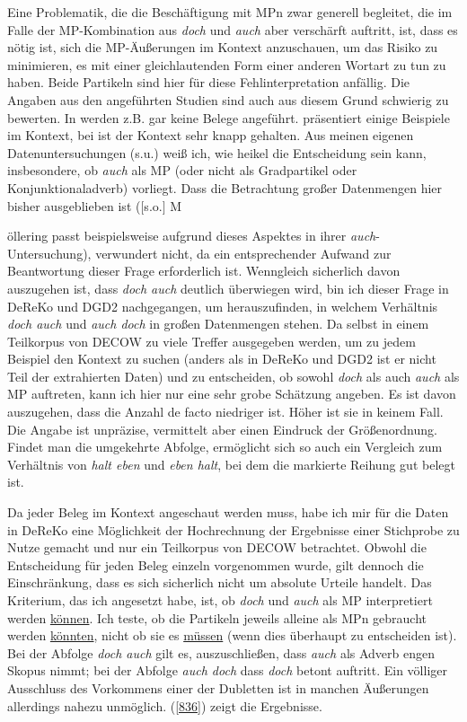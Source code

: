Eine Problematik, die die Beschäftigung mit MPn zwar generell begleitet, die im Falle der MP-Kombination aus \textit{doch} und \textit{auch} aber verschärft auftritt, ist, dass es nötig ist, sich die MP-Äußerungen im Kontext anzuschauen, um das Risiko zu minimieren, es mit einer gleichlautenden Form einer anderen Wortart zu tun zu haben. Beide Partikeln sind hier für diese Fehlinterpretation anfällig. Die Angaben aus den angeführten Studien sind auch aus diesem Grund schwierig zu bewerten. In \citet{Braber2010} werden z.B. gar keine Belege angeführt. \citet{Rudolph1983} präsentiert einige Beispiele im Kontext, bei \citet{Moellering2004} ist der Kontext sehr knapp gehalten. Aus meinen eigenen Datenuntersuchungen (s.u.) weiß ich, wie heikel die Entscheidung sein kann, insbesondere, ob \textit{auch} als MP (oder nicht als Gradpartikel  oder  Konjunktionaladverb) vorliegt. Dass die Betrachtung großer Datenmengen hier bisher ausgeblieben ist ($[$s.o.$]$ M{öllering passt beispielsweise aufgrund dieses Aspektes in ihrer \textit{auch}-Untersuchung), verwundert nicht, da ein entsprechender Aufwand zur Beantwortung dieser Frage erforderlich ist. Wenngleich sicherlich davon auszugehen ist, dass \textit{doch auch} deutlich überwiegen wird, bin ich dieser Frage in DeReKo und DGD2 nachgegangen, um herauszufinden, in welchem Verhältnis \textit{doch auch} und \textit{auch doch} in großen Datenmengen stehen. Da selbst in einem Teilkorpus von DECOW zu viele Treffer ausgegeben werden, um zu jedem Beispiel den Kontext zu suchen (anders als in DeReKo und DGD2 ist er nicht Teil der extrahierten Daten) und zu entscheiden, ob sowohl \textit{doch} als auch \textit{auch} als MP auftreten, kann ich hier nur eine sehr grobe Schätzung angeben. Es ist davon auszugehen, dass die Anzahl de facto niedriger ist. Höher ist sie in keinem Fall. Die Angabe ist unpräzise, vermittelt aber einen Eindruck der Größenordnung. Findet man die umgekehrte Abfolge, ermöglicht sich so auch ein Vergleich zum Verhältnis von \textit{halt eben} und \textit{eben halt}, bei dem die markierte Reihung gut belegt ist.

Da jeder Beleg im Kontext angeschaut werden muss, habe ich mir für die Daten in DeReKo eine Möglichkeit der Hochrechnung der Ergebnisse einer Stichprobe zu Nutze gemacht und \glq nur\grq {} ein Teilkorpus von DECOW betrachtet. Obwohl die Entscheidung für jeden Beleg einzeln vorgenommen wurde, gilt dennoch die Einschränkung, dass es sich sicherlich nicht um absolute Urteile handelt. Das Kriterium, das ich angesetzt habe, ist, ob \textit{doch} und \textit{auch} als MP interpretiert werden \underline{können}. Ich teste, ob die Partikeln jeweils alleine als MPn gebraucht werden \underline{könnten}, nicht ob sie es \underline{müssen} (wenn dies überhaupt zu entscheiden ist). Bei der Abfolge \textit{doch auch} gilt es, auszuschließen, dass \textit{auch} als Adverb  engen Skopus nimmt; bei der Abfolge \textit{auch doch} dass \textit{doch} betont auftritt. Ein völliger Ausschluss des Vorkommens einer der \glq Dubletten\grq {} ist in manchen Äußerungen allerdings nahezu unmöglich. (\ref{836}) zeigt die Ergebnisse.

}
